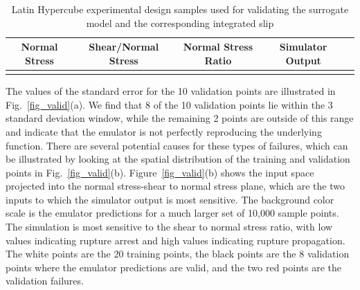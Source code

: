 \documentclass[openacc]{rstransa}%
\begin{document}
\begin{table}[!h]
\caption{Latin Hypercube experimental design samples used for validating the surrogate model and the
corresponding integrated slip}
\label{table_valid}
\begin{tabular}{ccccc}%
\hline
Normal Stress & Shear/Normal Stress & Normal Stress Ratio & Simulator Output \\
\hline

\\\hline
\end{tabular}
\vspace*{-4pt}
\end{table}%

The values of the standard error for the 10 validation points are illustrated
in Fig.~\ref{fig_valid}(a). We find that 8 of the 10 validation points lie
within the 3 standard deviation window, while the remaining 2 points are
outside of this range and indicate that the emulator is not perfectly
reproducing the underlying function. There are several potential causes
for these types of failures, which can be illustrated by looking at the
spatial distribution of the training and validation points in
Fig.~\ref{fig_valid}(b). Figure~\ref{fig_valid}(b) shows the input space
projected into the normal stress-shear to normal stress plane, which
are the two inputs to which the simulator output is most sensitive.
The background color scale is the emulator predictions for a much larger set
of 10,000 sample points. The simulation is most sensitive to the shear to
normal stress ratio, with low values indicating rupture arrest and high
values indicating rupture propagation. The white points are the 20 training
points, the black points are the 8 validation points where the emulator
predictions are valid, and the two red points are the validation failures.
\end{document}
